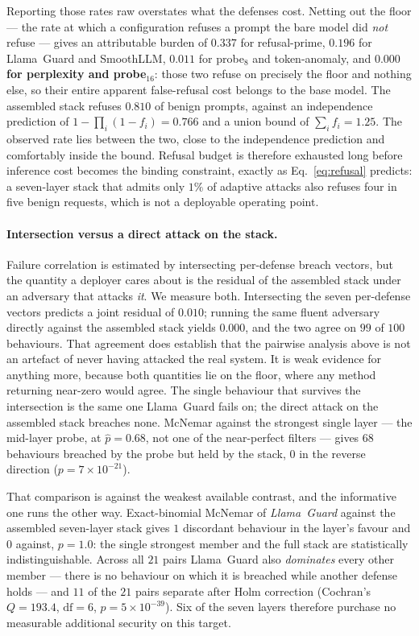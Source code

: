 Reporting those rates raw overstates what the defenses cost. Netting out the floor --- the
rate at which a configuration refuses a prompt the bare model did \emph{not} refuse --- gives
an attributable burden of $0.337$ for refusal-prime, $0.196$ for Llama~Guard and SmoothLLM,
$0.011$ for probe$_8$ and token-anomaly, and \textbf{$0.000$ for perplexity and
probe$_{16}$}: those two refuse on precisely the floor and nothing else, so their entire
apparent false-refusal cost belongs to the base model. The assembled
stack refuses $0.810$ of benign prompts, against an independence prediction of
$1-\prod_i(1-f_i)=0.766$ and a union bound of $\sum_i f_i=1.25$. The observed rate lies
between the two, close to the independence prediction and comfortably inside the bound.
Refusal budget is therefore exhausted long before inference cost becomes the binding
constraint, exactly as Eq.~\eqref{eq:refusal} predicts: a seven-layer stack that admits only
$1\%$ of adaptive attacks also refuses four in five benign requests, which is not a
deployable operating point.

\paragraph{Intersection versus a direct attack on the stack.}
Failure correlation is estimated by intersecting per-defense breach vectors, but the
quantity a deployer cares about is the residual of the assembled stack under an adversary
that attacks \emph{it}. We measure both. Intersecting the seven per-defense vectors predicts
a joint residual of $0.010$; running the same fluent adversary directly against the
assembled stack yields $0.000$, and the two agree on $99$ of $100$ behaviours. That
agreement does establish that the pairwise analysis above is not an artefact of never having
attacked the real system. It is weak evidence for anything more, because both quantities lie
on the floor, where any method returning near-zero would agree.
The single behaviour that survives the intersection is the same one Llama~Guard fails on;
the direct attack on the assembled stack breaches none. McNemar against the strongest single
layer --- the mid-layer probe, at $\hat p = 0.68$, not one of the near-perfect filters ---
gives $68$ behaviours breached by the probe but held by the stack, $0$ in the reverse
direction ($p = 7\times 10^{-21}$).

That comparison is against the weakest available contrast, and the informative one runs the
other way. Exact-binomial McNemar of \emph{Llama~Guard} against the assembled seven-layer
stack gives $1$ discordant behaviour in the layer's favour and $0$ against, $p=1.0$: the
single strongest member and the full stack are statistically indistinguishable. Across all
$21$ pairs Llama~Guard also \emph{dominates} every other member --- there is no behaviour on
which it is breached while another defense holds --- and $11$ of the $21$ pairs separate after
Holm correction (Cochran's $Q=193.4$, $\mathrm{df}=6$, $p=5\times10^{-39}$). Six of the seven
layers therefore purchase no measurable additional security on this target.

